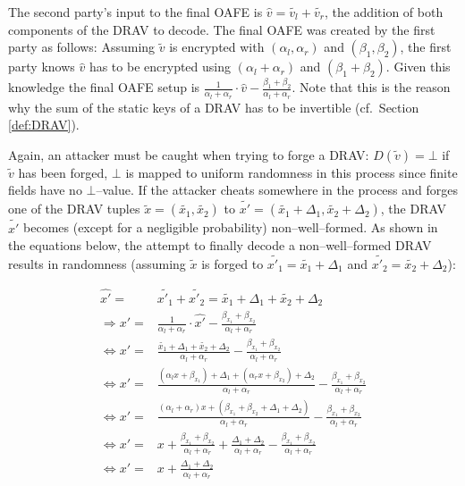 The second party's input to the final OAFE is $\widehat{v} = \widetilde{v_l} +
\widetilde{v_r}$, the addition of both components of the DRAV to decode.  The
final OAFE was created by the first party as follows: Assuming $\widetilde{v}$
is encrypted with $(\alpha_l, \alpha_r)$ and $(\beta_1, \beta_2)$, the first
party knows $\widehat{v}$ has to be encrypted using $(\alpha_l + \alpha_r)$ and
$(\beta_1 + \beta_2)$.  Given this knowledge the final OAFE setup is
$\frac{1}{\alpha_l + \alpha_r} \cdot \widehat{v} - \frac{\beta_1 +
\beta_2}{\alpha_l + \alpha_r}$. Note that this is the reason why the sum of the
static keys of a DRAV has to be invertible (cf.~Section \ref{def:DRAV}).

Again, an attacker must be caught when trying to forge a DRAV: $D(\widetilde{v})
= \bot$ if $\widetilde{v}$ has been forged, $\bot$ is mapped to uniform
randomness in this process since finite fields have no $\bot$--value. If the
attacker cheats somewhere in the process and forges one of the DRAV tuples
$\widetilde{x} = (\widetilde{x_1}, \widetilde{x_2})$ to $\widetilde{x'} =
(\widetilde{x_1} + \Delta_1, \widetilde{x_2} + \Delta_2)$, the DRAV
$\widetilde{x'}$ becomes (except for a negligible probability)
non--well--formed. As shown in the equations below, the attempt to finally
decode a non--well--formed DRAV results in randomness (assuming
$\widetilde{x}$ is forged to $\widetilde{x'_1} = \widetilde{x_1} + \Delta_1$ and
$\widetilde{x'_2} = \widetilde{x_2} + \Delta_2$):

\begin{align*}
  \widehat{x'} = & \widetilde{x'_1} + \widetilde{x'_2} = \widetilde{x_1} +
  \Delta_1 + \widetilde{x_2} + \Delta_2 \\
  \Rightarrow x' = & \frac{1}{\alpha_l + \alpha_r} \cdot \widehat{x'} -
  \frac{\beta_{x_1} +
  \beta_{x_2}}{\alpha_l + \alpha_r} \\
  \Leftrightarrow x' = & \frac{\widetilde{x_1} + \Delta_1 +
  \widetilde{x_2} + \Delta_2}{\alpha_l + \alpha_r} -
  \frac{\beta_{x_1} +\beta_{x_2}}{\alpha_l + \alpha_r}\\
  \Leftrightarrow x' = & \frac{(\alpha_l x + \beta_{x_1}) + \Delta_1 +
  (\alpha_r x + \beta_{x_2}) + \Delta_2}{\alpha_l + \alpha_r} -
  \frac{\beta_{x_1} +\beta_{x_2}}{\alpha_l + \alpha_r} \\
  \Leftrightarrow x' = & \frac{(\alpha_l+\alpha_r)x + (\beta_{x_1}+\beta_{x_2} +
  \Delta_1+\Delta_2)}{\alpha_l+\alpha_r} -
  \frac{\beta_{x_1} +\beta_{x_2}}{\alpha_l + \alpha_r} \\
  \Leftrightarrow x' = & x + \frac{\beta_{x_1}+\beta_{x_2}}{\alpha_l+\alpha_r}
  + \frac{\Delta_1 + \Delta_2}{\alpha_l + \alpha_r} -
  \frac{\beta_{x_1}+\beta_{x_2}}{\alpha_l + \alpha_r} \\
  \Leftrightarrow x' = & x + \frac{\Delta_1 + \Delta_2}{\alpha_l + \alpha_r}\\
\end{align*}

